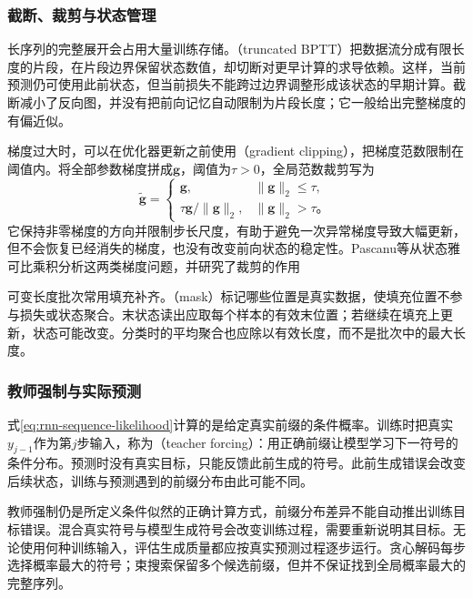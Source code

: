 \subsubsection{截断、裁剪与状态管理}
\label{sec:rnn-truncation}

长序列的完整展开会占用大量训练存储。（truncated BPTT）把数据流分成有限长度的片段，在片段边界保留状态数值，却切断对更早计算的求导依赖。这样，当前预测仍可使用此前状态，但当前损失不能跨过边界调整形成该状态的早期计算。截断减小了反向图，并没有把前向记忆自动限制为片段长度；它一般给出完整梯度的有偏近似。

梯度过大时，可以在优化器更新之前使用（gradient clipping），把梯度范数限制在阈值内。将全部参数梯度拼成$\bm{g}$，阈值为$\tau>0$，全局范数裁剪写为
\begin{equation}
  \widetilde{\bm{g}}=
  \begin{cases}
    \bm{g},&\lVert\bm{g}\rVert_2\leq\tau,\\
    \tau\bm{g}/\lVert\bm{g}\rVert_2,&\lVert\bm{g}\rVert_2>\tau\text{。}
  \end{cases}
  \label{eq:rnn-gradient-clipping}
\end{equation}
它保持非零梯度的方向并限制步长尺度，有助于避免一次异常梯度导致大幅更新，但不会恢复已经消失的梯度，也没有改变前向状态的稳定性。Pascanu等从状态雅可比乘积分析这两类梯度问题，并研究了裁剪的作用

可变长度批次常用填充补齐。（mask）标记哪些位置是真实数据，使填充位置不参与损失或状态聚合。末状态读出应取每个样本的有效末位置；若继续在填充上更新，状态可能改变。分类时的平均聚合也应除以有效长度，而不是批次中的最大长度。

\subsubsection{教师强制与实际预测}
\label{sec:rnn-teacher-forcing}

式\eqref{eq:rnn-sequence-likelihood}计算的是给定真实前缀的条件概率。训练时把真实$y_{j-1}$作为第$j$步输入，称为（teacher forcing）：用正确前缀让模型学习下一符号的条件分布。预测时没有真实目标，只能反馈此前生成的符号。此前生成错误会改变后续状态，训练与预测遇到的前缀分布由此可能不同。

教师强制仍是所定义条件似然的正确计算方式，前缀分布差异不能自动推出训练目标错误。混合真实符号与模型生成符号会改变训练过程，需要重新说明其目标。无论使用何种训练输入，评估生成质量都应按真实预测过程逐步运行。贪心解码每步选择概率最大的符号；束搜索保留多个候选前缀，但并不保证找到全局概率最大的完整序列。

